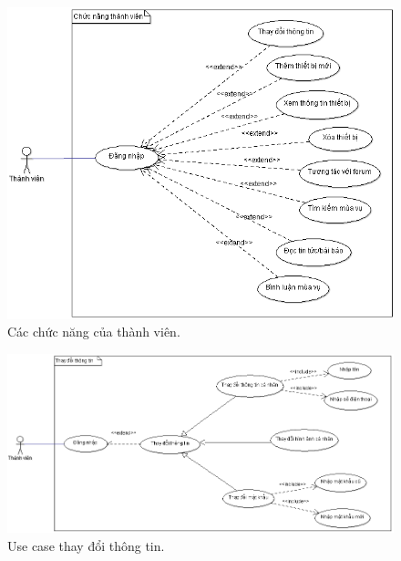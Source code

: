 \documentclass[a4paper,12pt,oneside]{article}
\begin{document}
\begin{figure}[htp]
\centering
\includegraphics[scale=.9]{hinh/cntv.png}
\caption{Các chức năng của thành viên.}
\end{figure}

\newpage
\begin{figure}[htp]
\centering
\includegraphics[scale=.6]{hinh/tdtt.png}
\caption{Use case thay đổi thông tin.}
\end{figure}
\end{document}
